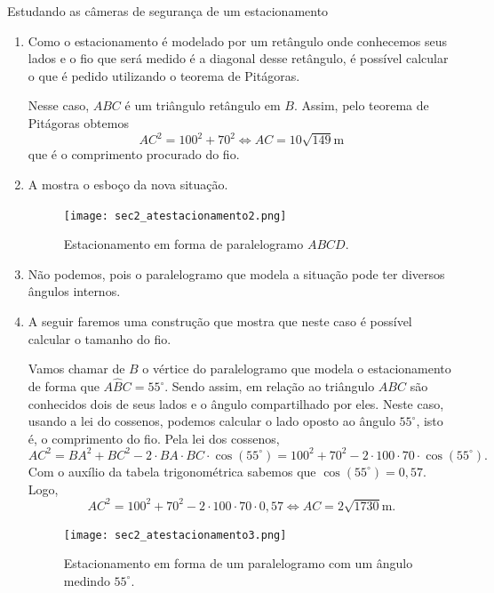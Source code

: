\begin{answer}{Estudando as câmeras de segurança de um estacionamento}
{
\setcounter{enumi}{1}
\begin{enumerate}
\item Como o estacionamento é modelado por um retângulo onde conhecemos seus lados e o fio que será medido é a diagonal desse retângulo, é possível calcular o que é pedido utilizando o teorema de Pitágoras. 
    
    Nesse caso, $ABC$ é um triângulo retângulo em $B$. Assim, pelo teorema de Pitágoras obtemos 
    $$AC^2=100^2+70^2 \iff AC=10\sqrt{149}\text{m}$$
    que é o comprimento procurado do fio.

    \item{}
    A  mostra o esboço da nova situação.
    \begin{figure}[H]
        \centering
        \texttt{[image: sec2\_atestacionamento2.png]}
        \caption{Estacionamento em forma de paralelogramo $ABCD$.}
        \label{sec2_resatestacionamento2}
    \end{figure}

    \item{}
    Não podemos, pois o paralelogramo que modela a situação pode ter diversos ângulos internos. 

    \item{}
    A seguir faremos uma construção que mostra que neste caso é possível calcular o tamanho do fio.
    
    Vamos chamar de $B$ o vértice do paralelogramo que modela o estacionamento de forma que $A\hat{B}C=55^\circ$. Sendo assim, em relação ao triângulo $ABC$ são conhecidos dois de seus lados e o ângulo compartilhado por eles. Neste caso, usando a lei do cossenos, podemos calcular o lado oposto ao ângulo $55^\circ$, isto é, o comprimento do fio.
    Pela lei dos cossenos,
    $$AC^2=BA^2+BC^2-2\cdot BA\cdot BC\cdot \cos(55^\circ)=100^2+70^2-2\cdot100\cdot70\cdot \cos(55^\circ).$$
    Com o auxílio da tabela trigonométrica sabemos que $\cos(55^\circ)=0,57$. Logo,
    $$AC^2=100^2+70^2-2\cdot100\cdot70\cdot 0,57 \iff AC=2\sqrt{1730}\text{m}.$$
    \begin{figure}[H]
        \centering
        \texttt{[image: sec2\_atestacionamento3.png]}
        \caption{Estacionamento em forma de um paralelogramo com um ângulo medindo $55^\circ$.}
        \label{sec2_resatestacionamento3}
    \end{figure}
    

\end{enumerate}}
\end{answer}

